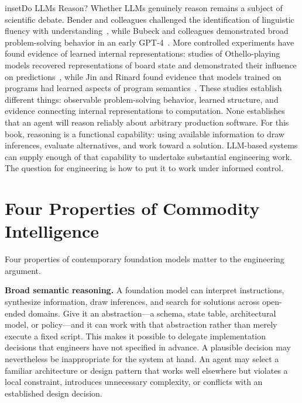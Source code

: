 


\begin{bookbox}{inset}{Do LLMs Reason?}
\label{do-llms-reason}
Whether LLMs genuinely reason remains a subject of scientific debate. Bender and colleagues challenged the identification of linguistic fluency with understanding~\citep{bender2021stochastic}, while Bubeck and colleagues demonstrated broad problem-solving behavior in an early GPT-4~\citep{bubeck2023sparks}. More controlled experiments have found evidence of learned internal representations: studies of Othello-playing models recovered representations of board state and demonstrated their influence on predictions~\citep{othello-gpt,nanda2023othello}, while Jin and Rinard found evidence that models trained on programs had learned aspects of program semantics~\citep{jin2024semantics}. These studies establish different things: observable problem-solving behavior, learned structure, and evidence connecting internal representations to computation. None establishes that an agent will reason reliably about arbitrary production software. For this book, reasoning is a functional capability: using available information to draw inferences, evaluate alternatives, and work toward a solution. LLM-based systems can supply enough of that capability to undertake substantial engineering work. The question for engineering is how to put it to work under informed control.
\end{bookbox}

\section{Four Properties of Commodity Intelligence}\label{heading:four-properties-of-commodity-intelligence}


Four properties of contemporary foundation models matter to the engineering argument.

\textbf{Broad semantic reasoning.} A foundation model can interpret instructions, synthesize information, draw inferences, and search for solutions across open-ended domains. Give it an abstraction---a schema, state table, architectural model, or policy---and it can work with that abstraction rather than merely execute a fixed script. This makes it possible to delegate implementation decisions that engineers have not specified in advance. A plausible decision may nevertheless be inappropriate for the system at hand. An agent may select a familiar architecture or design pattern that works well elsewhere but violates a local constraint, introduces unnecessary complexity, or conflicts with an established design decision.

